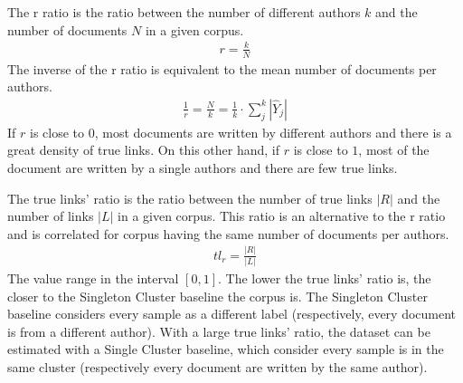 \begin{definition}
  The r ratio is the ratio between the number of different authors $k$ and the number of documents $N$ in a given corpus.
  \begin{gather*}
    r = \frac{k}{N}
  \end{gather*}
  The inverse of the r ratio is equivalent to the mean number of documents per authors.
  \begin{gather*}
    \frac{1}{r} = \frac{N}{k} = \frac{1}{k} \cdot \sum_{j}^{k} |\hat{Y}_j|
  \end{gather*}
  If $r$ is close to $0$, most documents are written by different authors and there is a great density of true links.
  On this other hand, if $r$ is close to $1$, most of the document are written by a single authors and there are few true links.
\end{definition}

\begin{definition}
  The true links' ratio is the ratio between the number of true links $|R|$ and the number of links $|L|$ in a given corpus.
  This ratio is an alternative to the r ratio and is correlated for corpus having the same number of documents per authors.
  \begin{gather*}
    tl_r = \frac{|R|}{|L|}
  \end{gather*}
  The value range in the interval $\left[0, 1\right]$.
  The lower the true links' ratio is, the closer to the Singleton Cluster baseline the corpus is.
  The Singleton Cluster baseline considers every sample as a different label (respectively, every document is from a different author).
  With a large true links' ratio, the dataset can be estimated with a Single Cluster baseline, which consider every sample is in the same cluster (respectively every document are written by the same author).
\end{definition}
